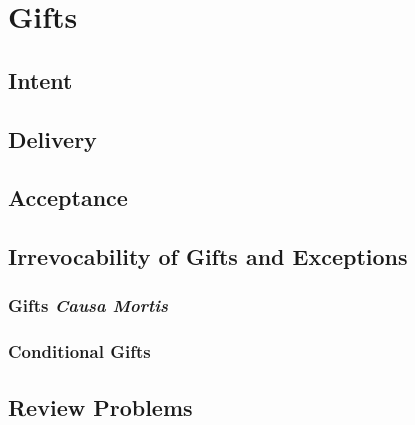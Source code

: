 \chapter{Gifts}




\section{Intent}




\section{Delivery}







\begin{questions}

\end{questions}




\begin{questions}

\end{questions}




\section{Acceptance}




\section{Irrevocability of Gifts and Exceptions}



\subsection{Gifts \textit{Causa Mortis}}



\subsection{Conditional Gifts}






\begin{questions}

\end{questions}

\section{Review Problems}


